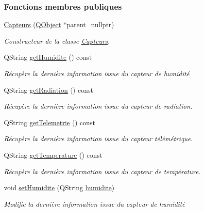 \subsubsection*{Fonctions membres publiques}
\begin{DoxyCompactItemize}
\item 
\hyperlink{class_capteurs_a9d34c185400db797961c72498c48bbc0}{Capteurs} (\hyperlink{class_q_object}{Q\+Object} $\ast$parent=nullptr)
\begin{DoxyCompactList}\small\item\em Constructeur de la classe \hyperlink{class_capteurs}{Capteurs}. \end{DoxyCompactList}\item 
Q\+String \hyperlink{class_capteurs_a419b69b8b2fcc02a9bb7bdff39f87b06}{get\+Humidite} () const
\begin{DoxyCompactList}\small\item\em Récupère la dernière information issue du capteur de humidité \end{DoxyCompactList}\item 
Q\+String \hyperlink{class_capteurs_aaee3d64c752b09f8674fa62907f38cbc}{get\+Radiation} () const
\begin{DoxyCompactList}\small\item\em Récupère la dernière information issue du capteur de radiation. \end{DoxyCompactList}\item 
Q\+String \hyperlink{class_capteurs_ad8c2c486e92cc537dc014035b5634b60}{get\+Telemetrie} () const
\begin{DoxyCompactList}\small\item\em Récupère la dernière information issue du capteur télémétrique. \end{DoxyCompactList}\item 
Q\+String \hyperlink{class_capteurs_aa1346e5cbea9e37afc3694a0ea86bd99}{get\+Temperature} () const
\begin{DoxyCompactList}\small\item\em Récupère la dernière information issue du capteur de température. \end{DoxyCompactList}\item 
void \hyperlink{class_capteurs_aafb06e1746006cdb72e92dc7a0519a2e}{set\+Humidite} (Q\+String \hyperlink{class_capteurs_a8967c76dbc9c1f2ff8339cb8f00c3adb}{humidite})
\begin{DoxyCompactList}\small\item\em Modifie la dernière information issue du capteur de humidité \end{DoxyCompactList}\item 

\end{DoxyCompactItemize}
